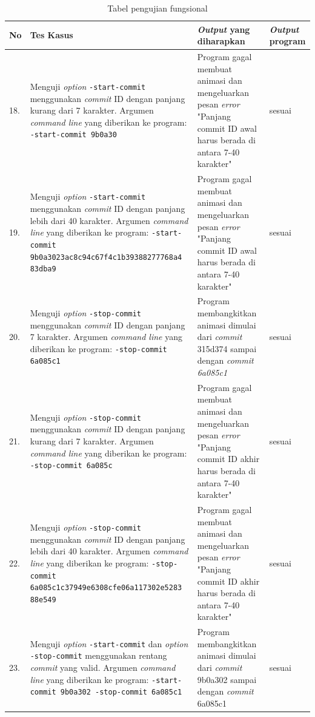 \begin{table}[htbp]
	\centering
	\caption{Tabel pengujian fungsional}
	
		\begin{tabular}{|p{0.3cm}|>{\raggedright} p{7 cm}| p{5.5 cm}| p{3 cm}|} \hline
		No & Tes Kasus	& \textit{Output} yang diharapkan & \textit{Output} program \\ \hline

18. & Menguji \textit{option} \texttt{-start-commit} menggunakan \textit{commit} ID dengan panjang kurang dari 7 karakter. Argumen \textit{command line} yang diberikan ke program: \texttt{-start-commit 9b0a30} & Program gagal membuat animasi dan mengeluarkan pesan \textit{error} "Panjang commit ID awal harus berada di antara 7-40 karakter" & sesuai  \\ \hline
		19.&  Menguji \textit{option} \texttt{-start-commit} menggunakan \textit{commit} ID dengan panjang lebih dari 40 karakter. Argumen \textit{command line} yang diberikan ke program:  \texttt{-start-commit 9b0a3023ac8c94c67f4c1b39388277768a4 83dba9} & Program gagal membuat animasi dan mengeluarkan pesan \textit{error} "Panjang commit ID awal harus berada di antara 7-40 karakter" & sesuai  \\ \hline
		20. & Menguji \textit{option} \texttt{-stop-commit} menggunakan \textit{commit} ID dengan panjang 7 karakter. Argumen \textit{command line} yang diberikan ke program:  \texttt{-stop-commit 6a085c1}  & Program membangkitkan animasi dimulai dari \textit{commit} 315d374 sampai dengan \textit{commit 6a085c1}  & sesuai  \\ \hline
		21. & Menguji \textit{option} \texttt{-stop-commit} menggunakan \textit{commit} ID dengan panjang kurang dari 7 karakter. Argumen \textit{command line} yang diberikan ke program: \texttt{-stop-commit 6a085c} & Program gagal membuat animasi dan mengeluarkan pesan \textit{error} "Panjang commit ID akhir harus berada di antara 7-40 karakter" & sesuai  \\ \hline
		22. & Menguji \textit{option} \texttt{-stop-commit} menggunakan \textit{commit} ID dengan panjang lebih dari 40 karakter. Argumen \textit{command line} yang diberikan ke program: \texttt{-stop-commit 6a085c1c37949e6308cfe06a117302e5283 88e549} & Program gagal membuat animasi dan mengeluarkan pesan \textit{error} "Panjang commit ID akhir harus berada di antara 7-40 karakter"  & sesuai  \\ \hline
		23. & Menguji \textit{option} \texttt{-start-commit} dan \textit{option} \texttt{-stop-commit} menggunakan rentang \textit{commit} yang valid. Argumen \textit{command line} yang diberikan ke program: \texttt{-start-commit 9b0a302 -stop-commit 6a085c1} & Program membangkitkan animasi dimulai dari \textit{commit} 9b0a302 sampai dengan \textit{commit} 6a085c1 & sesuai  \\ \hline

\end{tabular}
\end{table}
